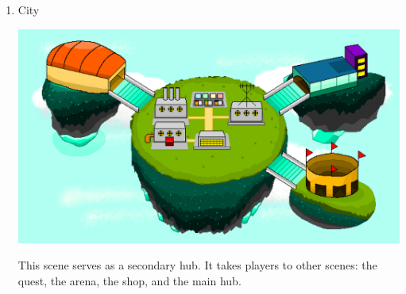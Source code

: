 \documentclass[12pt,oneside,openright,a4paper]{cpe-english-project}
\begin{document}
\begin{enumerate}
	\item City \\
	\begin{minipage}[c]{\textwidth}\centering
	\includegraphics[width=14cm]{figure/screenshot/screenshot-city.png}
	\end{minipage}
	This scene serves as a secondary hub. It takes players to other scenes: the quest, the arena, the shop, and the main hub.


\end{enumerate}
\end{document}
